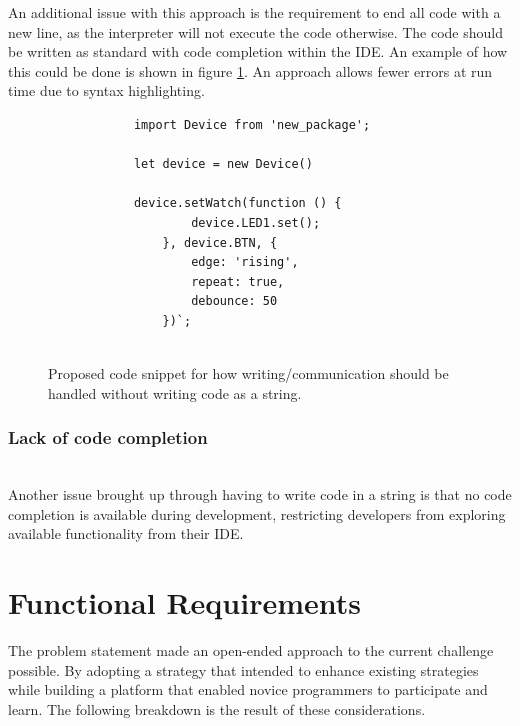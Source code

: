 \documentclass{l4proj}
\begin{document}
     An additional issue with this approach is the requirement to end all code with a new line, as the interpreter will not execute the code otherwise. The code should be written as standard with code completion within the IDE. An example of how this could be done is shown in figure \ref{fig:NEW_DEVICE_WRITING_CODE}. An approach allows fewer errors at run time due to syntax highlighting. 

     \begin{figure}[H]
     \centering
    \begin{minipage}{8cm}
        \begin{lstlisting}
            import Device from 'new_package';

            let device = new Device()
        
            device.setWatch(function () {
                    device.LED1.set();
                }, device.BTN, {
                    edge: 'rising',
                    repeat: true,
                    debounce: 50
                })`;
            
        \end{lstlisting}
        \end{minipage}
        \caption{Proposed code snippet for how writing/communication should be handled without writing code as a string.}
        \label{fig:NEW_DEVICE_WRITING_CODE}
    \end{figure}

\subsubsection{Lack of code completion}\hfill\\
Another issue brought up through having to write code in a string is that no code completion is available during development, restricting developers from exploring available functionality from their IDE.


\section{Functional Requirements}
The problem statement made an open-ended approach to the current challenge possible. By adopting a strategy that intended to enhance existing strategies while building a platform that enabled novice programmers to participate and learn. The following breakdown is the result of these considerations.
\end{document}
